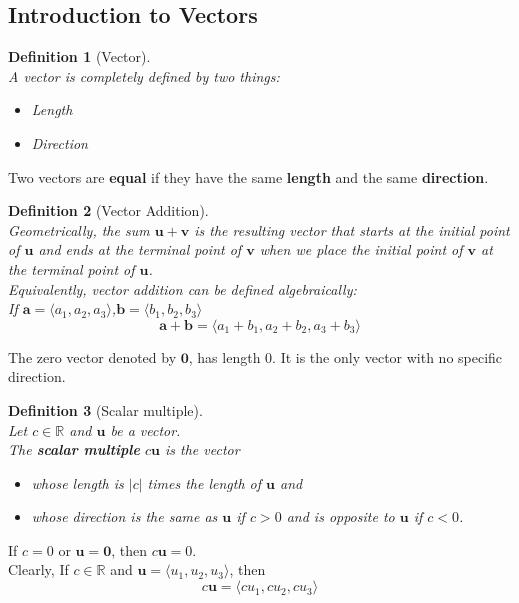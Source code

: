 \documentclass[12pt]{article}
\newtheorem{definition}{Definition}[section]
\theoremstyle{definition}
\newcommand\ve[1]{\mathbf{#1}}
\begin{document}
\subsection{Introduction to Vectors}
\begin{definition}[Vector]
\hfill\\\normalfont A vector is completely defined by two things:
\begin{itemize}
  \item Length
  \item Direction
\end{itemize}
\end{definition}
Two vectors are \textbf{equal} if they have the same \textbf{length} and the same \textbf{direction}.\\
\begin{definition}[Vector Addition]
\hfill\\\normalfont \textit{Geometrically}, the sum $\ve{u}+\ve{v}$ is the resulting vector that starts at the initial point of $\ve{u}$ and ends at the terminal point of $\ve{v}$ when we place the initial point of $\ve{v}$ at the terminal point of $\ve{u}$.\\
Equivalently, vector addition can be defined \textit{algebraically}: \\If $\ve{a}=\langle a_1,a_2,a_3\rangle$,$\ve{b}=\langle b_1,b_2,b_3\rangle$ 
\[
\ve{a}+\ve{b} = \langle a_1+b_1,a_2+b_2,a_3+b_3\rangle
\]
\end{definition}
The zero vector denoted by $\ve{0}$, has length 0. It is the only vector with no specific direction.
\begin{definition}[Scalar multiple]
\hfill\\\normalfont Let $c\in\mathbb{R}$ and $\ve{u}$ be a vector.\\The \textbf{scalar multiple} $c\ve{u}$ is the vector
\begin{itemize}
  \item whose length is $|c|$ times the length of $\ve{u}$ and 
  \item whose direction is the same as $\ve{u}$ if $c>0$ and is opposite to $\ve{u}$ if $c<0$.
\end{itemize}
\end{definition}
If $c=0$ or $\ve{u}=\ve{0}$, then $c\ve{u}=0$.\\
Clearly, If $c\in\mathbb{R}$ and $\ve{u}=\langle u_1,u_2,u_3\rangle$, then
\[
c\ve{u}=\langle cu_1,cu_2,cu_3\rangle
\]
\end{document}
